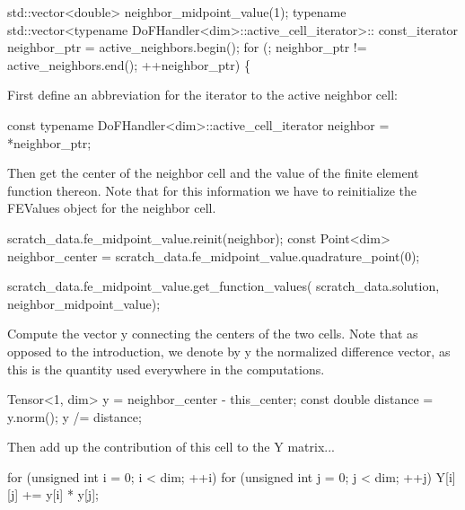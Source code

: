 \begin{DoxyCode}
std::vector<double> neighbor\_midpoint\_value(1);
\textcolor{keyword}{typename} std::vector<typename DoFHandler<dim>::active\_cell\_iterator>::
    const\_iterator neighbor\_ptr = active\_neighbors.begin();
\textcolor{keywordflow}{for} (; neighbor\_ptr != active\_neighbors.end(); ++neighbor\_ptr) \{
\end{DoxyCode}


First define an abbreviation for the iterator to the active neighbor cell\+:


\begin{DoxyCode}
\textcolor{keyword}{const} \textcolor{keyword}{typename} DoFHandler<dim>::active\_cell\_iterator neighbor =
    *neighbor\_ptr;
\end{DoxyCode}


Then get the center of the neighbor cell and the value of the finite element function thereon. Note that for this information we have to reinitialize the {\ttfamily F\+E\+Values} object for the neighbor cell.


\begin{DoxyCode}
scratch\_data.fe\_midpoint\_value.reinit(neighbor);
\textcolor{keyword}{const} Point<dim> neighbor\_center =
    scratch\_data.fe\_midpoint\_value.quadrature\_point(0);

scratch\_data.fe\_midpoint\_value.get\_function\_values(
    scratch\_data.solution, neighbor\_midpoint\_value);
\end{DoxyCode}


Compute the vector {\ttfamily y} connecting the centers of the two cells. Note that as opposed to the introduction, we denote by {\ttfamily y} the normalized difference vector, as this is the quantity used everywhere in the computations.


\begin{DoxyCode}
Tensor<1, dim> y = neighbor\_center - this\_center;
\textcolor{keyword}{const} \textcolor{keywordtype}{double} distance = y.norm();
y /= distance;
\end{DoxyCode}


Then add up the contribution of this cell to the Y matrix...


\begin{DoxyCode}
\textcolor{keywordflow}{for} (\textcolor{keywordtype}{unsigned} \textcolor{keywordtype}{int} i = 0; i < dim; ++i)
    \textcolor{keywordflow}{for} (\textcolor{keywordtype}{unsigned} \textcolor{keywordtype}{int} j = 0; j < dim; ++j) Y[i][j] += y[i] * y[j];
\end{DoxyCode}


